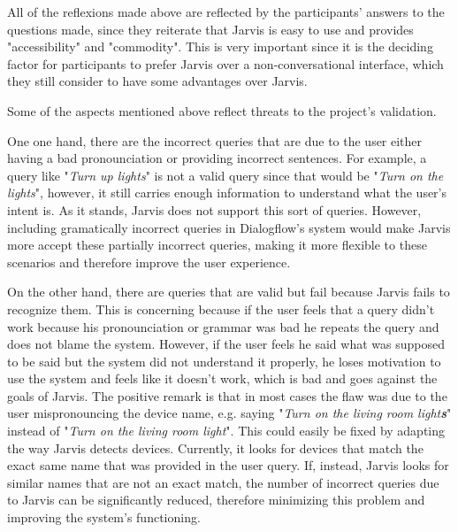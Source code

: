 \documentclass[runningheads]{llncs}
\begin{document}
All of the reflexions made above are reflected by the participants' answers to the questions made, since they reiterate that Jarvis is easy to use and provides "accessibility" and "commodity". This is very important since it is the deciding factor for participants to prefer Jarvis over a non-conversational interface, which they still consider to have some advantages over Jarvis.

Some of the aspects mentioned above reflect threats to the project's validation.

One one hand, there are the incorrect queries that are due to the user either having a bad pronounciation or providing incorrect sentences. For example, a query like "\textit{Turn up lights}" is not a valid query since that would be "\textit{Turn on the lights}", however, it still carries enough information to understand what the user's intent is. As it stands, Jarvis does not support this sort of queries. However, including gramatically incorrect queries in Dialogflow's system would make Jarvis more accept these partially incorrect queries, making it more flexible to these scenarios and therefore improve the user experience.

On the other hand, there are queries that are valid but fail because Jarvis fails to recognize them. This is concerning because if the user feels that a query didn't work because his pronounciation or grammar was bad he repeats the query and does not blame the system. However, if the user feels he said what was supposed to be said but the system did not understand it properly, he loses motivation to use the system and feels like it doesn't work, which is bad and goes against the goals of Jarvis. The positive remark is that in most cases the flaw was due to the user mispronouncing the device name, e.g. saying "\textit{Turn on the living room light\textbf{s}}" instead of "\textit{Turn on the living room light}". This could easily be fixed by adapting the way Jarvis detects devices. Currently, it looks for devices that match the exact same name that was provided in the user query. If, instead, Jarvis looks for similar names that are not an exact match, the number of incorrect queries due to Jarvis can be significantly reduced, therefore minimizing this problem and improving the system's functioning.
\end{document}
